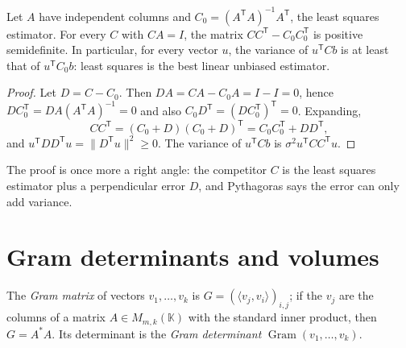 \begin{theorem}\label{linear:thm:gaussmarkov}
Let $A$ have independent columns and $C_0=(A^{\mathsf T}A)^{-1}A^{\mathsf T}$, the least squares estimator. For every
$C$ with $CA=I$, the matrix $CC^{\mathsf T}-C_0C_0^{\mathsf T}$ is positive semidefinite. In particular, for every
vector $u$, the variance of $u^{\mathsf T}Cb$ is at least that of $u^{\mathsf T}C_0b$: least squares is the best linear
unbiased estimator.
\end{theorem}
\begin{proof}
Let $D=C-C_0$. Then $DA=CA-C_0A=I-I=0$, hence $DC_0^{\mathsf T}=DA(A^{\mathsf T}A)^{-1}=0$ and also $C_0D^{\mathsf
T}=(DC_0^{\mathsf T})^{\mathsf T}=0$. Expanding,
\[
CC^{\mathsf T}=(C_0+D)(C_0+D)^{\mathsf T}=C_0C_0^{\mathsf T}+DD^{\mathsf T},
\]
and $u^{\mathsf T}DD^{\mathsf T}u=\|D^{\mathsf T}u\|^2\ge0$. The variance of $u^{\mathsf T}Cb$ is
$\sigma^2u^{\mathsf T}CC^{\mathsf T}u$.
\end{proof}

The proof is once more a right angle: the competitor $C$ is the least squares estimator plus a perpendicular error
$D$, and Pythagoras says the error can only add variance.

\section{Gram determinants and volumes}

The \emph{Gram matrix} of vectors $v_1,\dots,v_k$ is $G=(\langle v_j,v_i\rangle)_{i,j}$; if the $v_j$ are the columns of
a matrix $A\in M_{m,k}(\mathbb K)$ with the standard inner product, then $G=A^*A$. Its determinant is the \emph{Gram
determinant} $\operatorname{Gram}(v_1,\dots,v_k)$.

